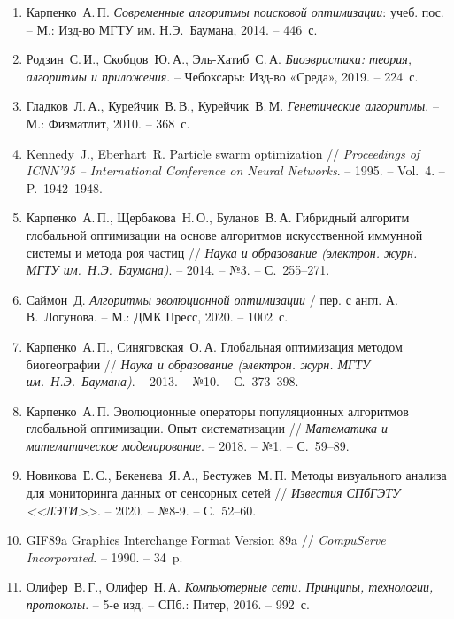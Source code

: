 \documentclass[14pt, russian]{scrartcl}
\begin{document}
\begin{enumerate}
  \item Карпенко~А.\,П. \textit{Современные алгоритмы поисковой оптимизации}:
  учеб. пос. – М.: Изд-во МГТУ им. Н.Э.~Баумана, 2014. – 446~с.

  \item Родзин~С.\,И., Скобцов~Ю.\,А., Эль-Хатиб~С.\,А. \textit{Биоэвристики:
  теория, алгоритмы и приложения}. – Чебоксары: Изд-во «Среда», 2019. –
  224~с.

  \item Гладков~Л.\,А., Курейчик~В.\,В., Курейчик~В.\,М. \textit{Генетические
  алгоритмы}. – М.: Физматлит, 2010. – 368~с.

  \item Kennedy~J., Eberhart~R. Particle swarm optimization // \textit{Proceedings
  of ICNN'95 – International Conference on Neural Networks}. – 1995. –
  Vol.~4. – P.~1942–1948.

  \item Карпенко~А.\,П., Щербакова~Н.\,О., Буланов~В.\,А. Гибридный алгоритм
  глобальной оптимизации на основе алгоритмов искусственной иммунной системы
  и метода роя частиц // \textit{Наука и образование (электрон. журн. МГТУ
  им.~Н.Э.~Баумана)}. – 2014. – №3. – С.~255–271.

  \item Саймон~Д. \textit{Алгоритмы эволюционной оптимизации} / пер. с англ.
  А.\,В.~Логунова. – М.: ДМК Пресс, 2020. – 1002~с.

  \item Карпенко~А.\,П., Синяговская~О.\,А. Глобальная оптимизация методом
  биогеографии // \textit{Наука и образование (электрон. журн. МГТУ
  им.~Н.Э.~Баумана)}. – 2013. – №10. – С.~373–398.

  \item Карпенко~А.\,П. Эволюционные операторы популяционных алгоритмов
  глобальной оптимизации. Опыт систематизации // \textit{Математика и 
  математическое моделирование}. – 2018. – №1. – С.~59–89.

  \item Новикова~Е.\,С., Бекенева~Я.\,А., Бестужев~М.\,П. Методы 
  визуального анализа для мониторинга данных от сенсорных сетей // 
  \textit{Известия СПбГЭТУ <<ЛЭТИ>>}. – 2020. – №8-9. – С.~52–60.

  \item GIF89a Graphics Interchange Format Version 89a //
  \textit{CompuServe Incorporated}. – 1990. – 34~p.

  \item Олифер~В.\,Г., Олифер~Н.\,А. \textit{Компьютерные сети. Принципы,
  технологии, протоколы}. – 5-е изд. – СПб.: Питер, 2016. – 992~с.


\end{enumerate}
\end{document}
